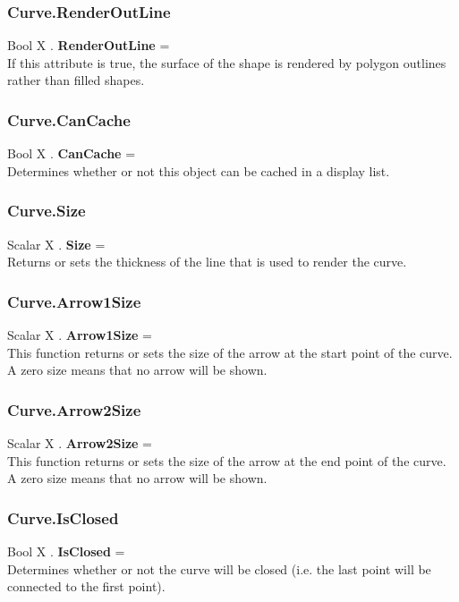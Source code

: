 \subsubsection{Curve.RenderOutLine \label{F:Curve:RenderOutLine}}
Bool X . \textbf{RenderOutLine} = \\
If this attribute is true, the surface of the shape is rendered by polygon outlines rather than filled shapes.

\subsubsection{Curve.CanCache \label{F:Curve:CanCache}}
Bool X . \textbf{CanCache} = \\
Determines whether or not this object can be cached in a display list.

\subsubsection{Curve.Size \label{F:Curve:Size}}
Scalar X . \textbf{Size} = \\
Returns or sets the thickness of the line that is used to render the curve.

\subsubsection{Curve.Arrow1Size \label{F:Curve:Arrow1Size}}
Scalar X . \textbf{Arrow1Size} = \\
This function returns or sets the size of the arrow at the start point of the curve. A zero size means that no arrow will be shown.

\subsubsection{Curve.Arrow2Size \label{F:Curve:Arrow2Size}}
Scalar X . \textbf{Arrow2Size} = \\
This function returns or sets the size of the arrow at the end point of the curve. A zero size means that no arrow will be shown.

\subsubsection{Curve.IsClosed \label{F:Curve:IsClosed}}
Bool X . \textbf{IsClosed} = \\
Determines whether or not the curve will be closed (i.e. the last point will be connected to the first point).

